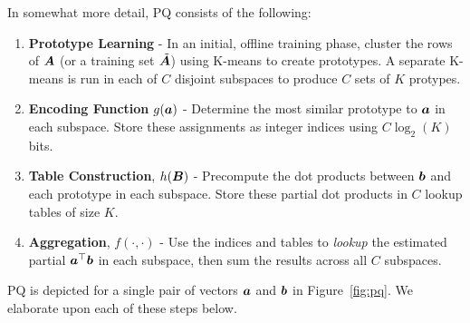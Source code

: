 In somewhat more detail, PQ consists of the following:
\vspace{-3mm}
\begin{enumerate}\itemsep1mm
    \item \textbf{Prototype Learning} - In an initial, offline training phase,  cluster the rows of $\bm{A}$ (or a training set $\tilde{\bm{A}}$) using K-means to create prototypes. A separate K-means is run in each of $C$ disjoint subspaces to produce $C$ sets of $K$ protypes. %
    \item \textbf{Encoding Function} $g(\bm{a})$ - Determine the most similar prototype to $\bm{a}$ in each subspace. Store these assignments as integer indices using $C \log_2(K)$ bits.
    \item \textbf{Table Construction}, $h(\bm{B})$ - Precompute the dot products between $\bm{b}$ and each prototype in each subspace. Store these partial dot products in $C$ lookup tables of size $K$.
    \item \textbf{Aggregation}, $f(\cdot,\cdot)$ - Use the indices and tables to \textit{lookup} the estimated partial $\bm{a}^\top \bm{b}$ in each subspace, then sum the results across all $C$ subspaces. %
\end{enumerate}
\vspace{-3mm}
PQ is depicted for a single pair of vectors $\bm{a}$ and $\bm{b}$ in Figure~\ref{fig:pq}. We elaborate upon each of these steps below.

\vspace{-2mm}
